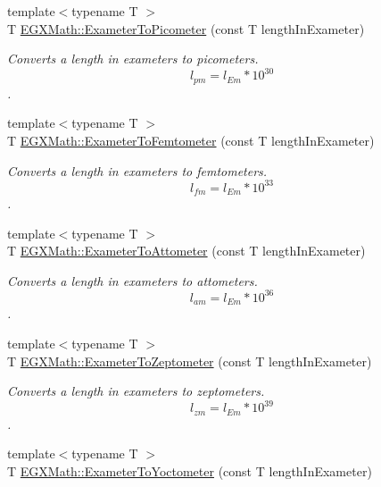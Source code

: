 \begin{DoxyCompactItemize}
{\footnotesize template$<$typename T $>$ }\\T \mbox{\hyperlink{group___e_g_x_math-_conversions-_length_conversions-_s_i-_exameter-_s_i_gaf524e8324fedf2eb61d43ce1dc36bcac}{E\+G\+X\+Math\+::\+Exameter\+To\+Picometer}} (const T length\+In\+Exameter)
\begin{DoxyCompactList}\small\item\em Converts a length in exameters to picometers. \[ l_{pm}=l_{Em} * 10^{30} \]. \end{DoxyCompactList}\item 
{\footnotesize template$<$typename T $>$ }\\T \mbox{\hyperlink{group___e_g_x_math-_conversions-_length_conversions-_s_i-_exameter-_s_i_gaaa4f07b6d6b2e4a9e1947d4d9724c110}{E\+G\+X\+Math\+::\+Exameter\+To\+Femtometer}} (const T length\+In\+Exameter)
\begin{DoxyCompactList}\small\item\em Converts a length in exameters to femtometers. \[ l_{fm}=l_{Em} * 10^{33} \]. \end{DoxyCompactList}\item 
{\footnotesize template$<$typename T $>$ }\\T \mbox{\hyperlink{group___e_g_x_math-_conversions-_length_conversions-_s_i-_exameter-_s_i_ga9218bf3c4bf645d50a26dda886a81765}{E\+G\+X\+Math\+::\+Exameter\+To\+Attometer}} (const T length\+In\+Exameter)
\begin{DoxyCompactList}\small\item\em Converts a length in exameters to attometers. \[ l_{am}=l_{Em} * 10^{36} \]. \end{DoxyCompactList}\item 
{\footnotesize template$<$typename T $>$ }\\T \mbox{\hyperlink{group___e_g_x_math-_conversions-_length_conversions-_s_i-_exameter-_s_i_ga5c4c4016d9d88622b4f3c5c071779025}{E\+G\+X\+Math\+::\+Exameter\+To\+Zeptometer}} (const T length\+In\+Exameter)
\begin{DoxyCompactList}\small\item\em Converts a length in exameters to zeptometers. \[ l_{zm}=l_{Em} * 10^{39} \]. \end{DoxyCompactList}\item 
{\footnotesize template$<$typename T $>$ }\\T \mbox{\hyperlink{group___e_g_x_math-_conversions-_length_conversions-_s_i-_exameter-_s_i_ga0da838a3aa4a2f6ee53687aa346f80ef}{E\+G\+X\+Math\+::\+Exameter\+To\+Yoctometer}} (const T length\+In\+Exameter)

\end{DoxyCompactItemize}
